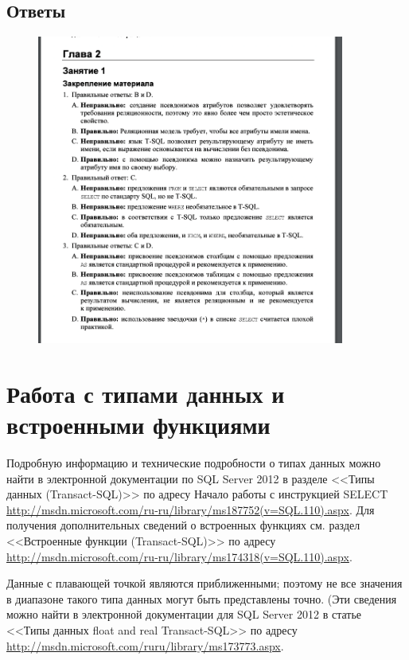 \subsection*{Ответы}

\begin{figure}[h!]
	\begin{center}
		\includegraphics[width=0.9\textwidth]{img/ans3.png}
	\end{center}
	\captionsetup{justification=centering}
\end{figure}
\newpage




\section{Работа с типами данных и встроенными функциями}

Подробную информацию и технические подробности о типах данных можно найти в электронной документации по SQL Server 2012 в разделе <<Типы данных (Transact-SQL)>> по адресу Начало работы с инструкцией SELECT
\url{http://msdn.microsoft.com/ru-ru/library/ms187752(v=SQL.110).aspx}. Для получения дополнительных сведений о встроенных функциях см. раздел <<Встроенные функции (Transact-SQL)>> по адресу \url{http://msdn.microsoft.com/ru-ru/library/ms174318(v=SQL.110).aspx}. 

Данные с плавающей точкой являются приближенными; поэтому не все значения в диапазоне такого типа данных могут быть представлены точно. (Эти сведения можно найти в электронной документации для SQL Server 2012 в статье
<<Типы данных float and real Transact-SQL>> по адресу \url{http://msdn.microsoft.com/ruru/library/ms173773.aspx}.

